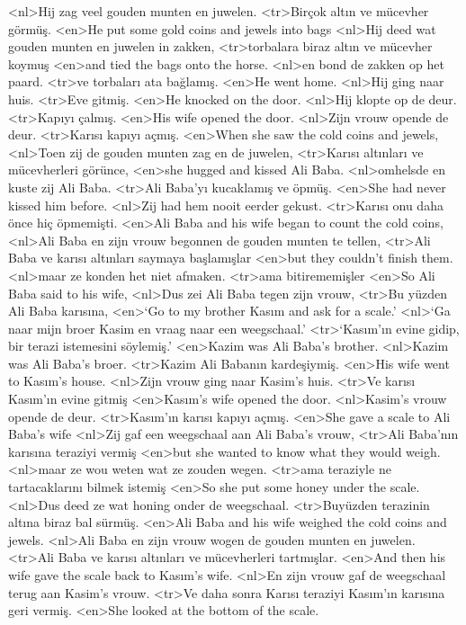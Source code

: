 <nl>Hij zag veel gouden munten en juwelen. 
<tr>Birçok altın ve mücevher görmüş.
<en>He put some gold coins and jewels into bags
<nl>Hij deed wat gouden munten en juwelen in zakken, 
<tr>torbalara biraz altın ve mücevher koymuş 
<en>and tied the bags onto the horse.
<nl>en bond de zakken op het paard. 
<tr>ve torbaları ata bağlamış.
<en>He went home.
<nl>Hij ging naar huis. 
<tr>Eve gitmiş.
<en>He knocked on the door.
<nl>Hij klopte op de deur.
<tr>Kapıyı çalmış.
<en>His wife opened the door.
<nl>Zijn vrouw opende de deur. 
<tr>Karısı kapıyı açmış.
<en>When she saw the cold coins and jewels,
<nl>Toen zij de gouden munten zag en de juwelen, 
<tr>Karısı altınları ve mücevherleri görünce,
<en>she hugged and kissed Ali Baba.
<nl>omhelsde en kuste zij Ali Baba.
<tr>Ali Baba’yı kucaklamış ve öpmüş.
<en>She had never kissed him before.
<nl>Zij had hem nooit eerder gekust.
<tr>Karısı onu daha önce hiç öpmemişti.
<en>Ali Baba and his wife began to count the cold coins,
<nl>Ali Baba en zijn vrouw begonnen de gouden munten te tellen, 
<tr>Ali Baba ve karısı altınları saymaya başlamışlar
<en>but they couldn’t finish them.
<nl>maar ze konden het niet afmaken.
<tr>ama bitirememişler
<en>So Ali Baba said to his wife,
<nl>Dus zei Ali Baba tegen zijn vrouw, 
<tr>Bu yüzden Ali Baba karısına,
<en>`Go to my brother Kasım and ask for a scale.'
<nl>`Ga naar mijn broer Kasim en vraag naar een weegschaal.'
<tr>`Kasım’ın evine gidip, bir terazi istemesini söylemiş.'
<en>Kazim was Ali Baba’s brother.
<nl>Kazim was Ali Baba's broer. 
<tr>Kazim Ali Babanın kardeşiymiş.
<en>His wife went to Kasım’s house.
<nl>Zijn vrouw ging naar Kasim's huis.
<tr>Ve karısı Kasım’ın evine gitmiş
<en>Kasım’s wife opened the door.
<nl>Kasim's vrouw opende de deur. 
<tr>Kasım’ın karısı kapıyı açmış.
<en>She gave a scale to Ali Baba’s wife
<nl>Zij gaf een weegschaal aan Ali Baba's vrouw,
<tr>Ali Baba’nın karısına teraziyi vermiş
<en>but she wanted to know what they would weigh.
<nl>maar ze wou weten wat ze zouden wegen. 
<tr>ama teraziyle ne tartacaklarını  bilmek istemiş
<en>So she put some honey under the scale.
<nl>Dus deed ze wat honing onder de weegschaal. 
<tr>Buyüzden terazinin altına biraz bal sürmüş.
<en>Ali Baba and his wife weighed the cold coins and jewels.
<nl>Ali Baba en zijn vrouw wogen de gouden munten en juwelen.
<tr>Ali Baba ve karısı altınları ve mücevherleri tartmışlar.
<en>And then his wife gave the scale back to Kasım’s wife.
<nl>En zijn vrouw gaf de weegschaal terug aan Kasim's vrouw. 
<tr>Ve daha sonra Karısı teraziyi Kasım’ın karısına geri vermiş.
<en>She looked at the bottom of the scale.
